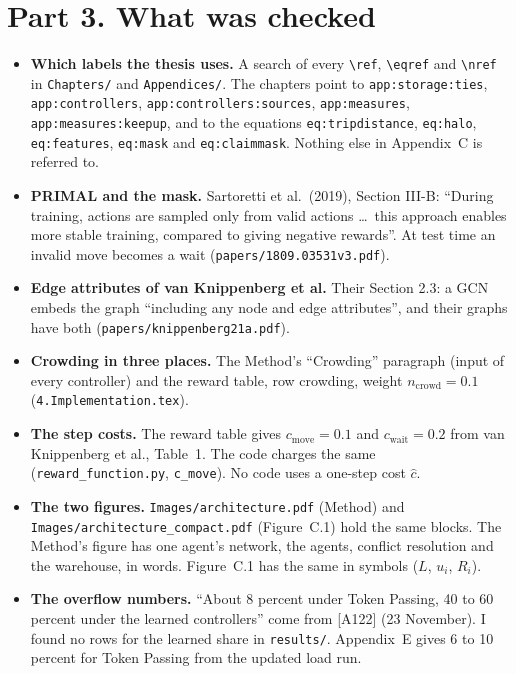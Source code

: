 \documentclass[11pt,a4paper]{article}
\newcommand{\lref}[1]{{\small\texttt{#1}}}
\begin{document}
\section*{Part 3. What was checked}
\begin{itemize}[nosep]
  \item \textbf{Which labels the thesis uses.} A search of every
        \texttt{\textbackslash ref}, \texttt{\textbackslash eqref} and
        \texttt{\textbackslash nref} in \texttt{Chapters/} and
        \texttt{Appendices/}. The chapters point to
        \lref{app:storage:ties}, \lref{app:controllers},
        \lref{app:controllers:sources}, \lref{app:measures},
        \lref{app:measures:keepup}, and to the equations
        \lref{eq:tripdistance}, \lref{eq:halo}, \lref{eq:features},
        \lref{eq:mask} and \lref{eq:claimmask}. Nothing else in
        Appendix~C is referred to.
  \item \textbf{PRIMAL and the mask.} Sartoretti et al.\ (2019), Section
        III-B: ``During training, actions are sampled only from valid
        actions \ldots\ this approach enables more stable training, compared
        to giving negative rewards''. At test time an invalid move becomes a
        wait (\texttt{papers/1809.03531v3.pdf}).
  \item \textbf{Edge attributes of van Knippenberg et al.} Their Section 2.3:
        a GCN embeds the graph ``including any node and edge attributes'',
        and their graphs have both (\texttt{papers/knippenberg21a.pdf}).
  \item \textbf{Crowding in three places.} The Method's ``Crowding''
        paragraph (input of every controller) and the reward table, row
        crowding, weight $n_{\mathrm{crowd}} = 0.1$
        (\texttt{4.Implementation.tex}).
  \item \textbf{The step costs.} The reward table gives $c_{\mathrm{move}}
        = 0.1$ and $c_{\mathrm{wait}} = 0.2$ from van Knippenberg et al.,
        Table~1. The code charges the same (\texttt{reward\_function.py},
        \texttt{c\_move}). No code uses a one-step cost $\hat c$.
  \item \textbf{The two figures.} \texttt{Images/architecture.pdf} (Method)
        and \texttt{Images/architecture\_compact.pdf} (Figure~C.1) hold the
        same blocks. The Method's figure has one agent's network, the agents,
        conflict resolution and the warehouse, in words. Figure~C.1 has the
        same in symbols ($L$, $u_i$, $R_i$).
  \item \textbf{The overflow numbers.} ``About 8 percent under Token Passing,
        40 to 60 percent under the learned controllers'' come from [A122]
        (23 November). I found no rows for the learned share in
        \texttt{results/}. Appendix~E gives 6 to 10 percent for Token
        Passing from the updated load run.
\end{itemize}
\end{document}
